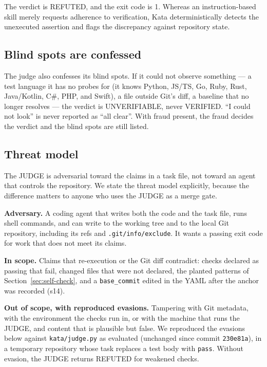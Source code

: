 \documentclass[11pt]{article}
\begin{document}
The verdict is REFUTED, and the exit code is 1. Whereas an instruction-based
skill merely requests adherence to verification, Kata deterministically
detects the unexecuted assertion and flags the discrepancy against repository state.

\subsection{Blind spots are confessed}

The judge also confesses its blind spots. If it could not observe something
--- a test language it has no probes for (it knows Python, JS/TS, Go, Ruby,
Rust, Java/Kotlin, C\#, PHP, and Swift), a file outside Git's diff, a
baseline that no longer resolves --- the verdict is UNVERIFIABLE, never
VERIFIED. ``I could not look'' is never reported as ``all clear''. With
fraud present, the fraud decides the verdict and the blind spots are still
listed.

\subsection{Threat model}
\label{sec:threat-model}

The JUDGE is adversarial toward the claims in a task file, not toward an
agent that controls the repository. We state the threat model explicitly,
because the difference matters to anyone who uses the JUDGE as a merge gate.

\textbf{Adversary.} A coding agent that writes both the code and the task
file, runs shell commands, and can write to the working tree and to the local
Git repository, including its refs and \texttt{.git/info/exclude}. It wants a
passing exit code for work that does not meet its claims.

\textbf{In scope.} Claims that re-execution or the Git diff contradict:
checks declared as passing that fail, changed files that were not declared,
the planted patterns of Section~\ref{sec:self-check}, and a
\texttt{base\_commit} edited in the YAML after the anchor was recorded (s14).

\textbf{Out of scope, with reproduced evasions.} Tampering with Git metadata,
with the environment the checks run in, or with the machine that runs the
JUDGE, and content that is plausible but false. We reproduced the evasions
below against \texttt{kata/judge.py} as evaluated (unchanged since commit
\texttt{230e81a}), in a temporary repository whose task replaces a test body
with \texttt{pass}. Without evasion, the JUDGE returns REFUTED for weakened
checks.
\end{document}
